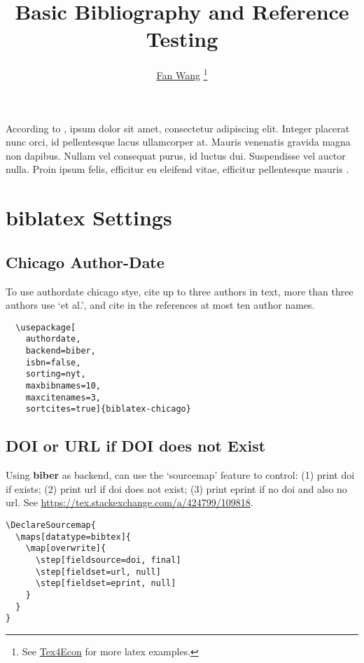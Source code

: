 \documentclass[12pt,english]{article}
\begin{document}
\title{Basic Bibliography and Reference Testing}
\author{\href{http://fanwangecon.github.io/}{Fan Wang} \thanks{See \href{https://fanwangecon.github.io/Tex4Econ/}{Tex4Econ} for more latex examples.}}

\maketitle

According to \textcite{becker_human_1986}, ipsum dolor sit amet, consectetur adipiscing elit. Integer placerat nunc orci, id pellentesque lacus ullamcorper at. Mauris venenatis gravida magna non dapibus. Nullam vel consequat purus, id luctus dui. Suspendisse vel auctor nulla. Proin ipsum felis, efficitur eu eleifend vitae, efficitur pellentesque mauris \autocite{case_lasting_2005, conti_understanding_2010}.


\section{biblatex Settings}

\subsection{Chicago Author-Date}

To use authordate chicago stye, cite up to three authors in text, more than three authors use `et al.', and cite in the references at most ten author names. 

\begin{verbatim}
  \usepackage[
    authordate,
    backend=biber,
    isbn=false,
    sorting=nyt,
    maxbibnames=10,
    maxcitenames=3,
    sortcites=true]{biblatex-chicago}
\end{verbatim}

\subsection{DOI or URL if DOI does not Exist}

Using \textbf{biber} as backend, can use the `sourcemap' feature to control: (1) print doi if exists; (2) print url if doi does not exist; (3) print eprint if no doi and also no url. See \url{https://tex.stackexchange.com/a/424799/109818}.

\begin{verbatim}
\DeclareSourcemap{
  \maps[datatype=bibtex]{
    \map[overwrite]{
      \step[fieldsource=doi, final]
      \step[fieldset=url, null]
      \step[fieldset=eprint, null]
    }
  }
}
\end{verbatim}
\end{document}
